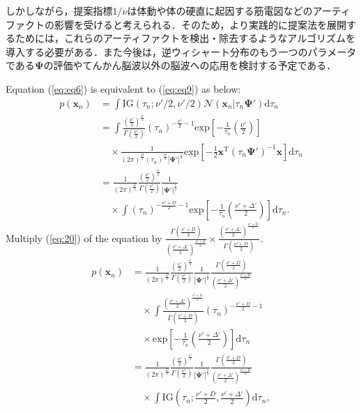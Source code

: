 \documentclass[journal]{IEEEtran}
\begin{document}
しかしながら，提案指標$1/\nu$は体動や体の硬直に起因する筋電図などのアーティファクトの影響を受けると考えられる．そのため，より実践的に提案法を展開するためには，これらのアーティファクトを検出・除去するようなアルゴリズムを導入する必要がある．また今後は，逆ウィシャート分布のもう一つのパラメータである$\mathbf{\Psi}$の評価やてんかん脳波以外の脳波への応用を検討する予定である．



Equation (\ref{eq:eq6}) is equivalent to (\ref{eq:eq9}) as below:
\begin{align}
	p(\mathbf{x}_n) &= \int \mathrm{IG}(\tau_n;\nu'/2,\nu'/2) \mathcal{N}(\mathbf{x}_n|\tau_n \mathbf{\Psi}') \mathrm{d}{\tau_n} \nonumber\\
	&= \int \frac{\left(\frac{\nu'}{2}\right)^{\frac{\nu'}{2}}}{\Gamma \left(\frac{\nu'}{2}\right)} (\tau_n)^{-\frac{\nu'}{2}-1} \mathrm{exp} \left[-\frac{1}{\tau_n} \left(\frac{\nu'}{2} \right) \right] \nonumber\\
	&\quad\times\frac{1}{(2\pi)^{\frac{D}{2}}(\tau_n)^{\frac{D}{2}}|\mathbf{\Psi'}|^{\frac{1}{2}}} \mathrm{exp} \left[-\frac{1}{2}\mathbf{x}^\mathrm{T} (\tau_n\mathbf{\Psi'})^{-1} \mathbf{x}\right] \mathrm{d}{\tau_n} \nonumber\\
	&=\frac{1}{(2\pi)^{\frac{D}{2}}}\frac{\left(\frac{\nu'}{2}\right)^{\frac{\nu'}{2}}}{\Gamma \left(\frac{\nu'}{2}\right)}\frac{1}{|\mathbf{\Psi'}|^{\frac{1}{2}}} \nonumber\\
	\label{eq:20}
	&\quad\times \int (\tau_n)^{-\frac{\nu'+D}{2}-1} \mathrm{exp} \left[-\frac{1}{\tau_n} \left(\frac{\nu' + \Delta'}{2}\right) \right] \mathrm{d}{\tau_n}.
\end{align}
Multiply (\ref{eq:20}) of the equation by $\frac{\Gamma \left(\frac{\nu'+D}{2}\right)}{\left(\frac{\nu'+\Delta'}{2}\right)^{\frac{\nu'+D}{2}}} \times \frac{\left(\frac{\nu'+\Delta'}{2}\right)^{\frac{\nu'+D}{2}}}{\Gamma \left(\frac{\nu'+D}{2}\right)}$.
\begin{align}
	p(\mathbf{x}_n) &=\frac{1}{(2\pi)^{\frac{D}{2}}}\frac{\left(\frac{\nu'}{2}\right)^{\frac{\nu'}{2}}}{\Gamma \left(\frac{\nu'}{2}\right)}\frac{1}{|\mathbf{\Psi'}|^{\frac{1}{2}}} \frac{\Gamma \left(\frac{\nu'+D}{2}\right)}{\left(\frac{\nu'+\Delta'}{2}\right)^{\frac{\nu'+D}{2}}}\nonumber\\
	&\quad\times \int \frac{\left(\frac{\nu'+\Delta'}{2}\right)^{\frac{\nu'+D}{2}}}{\Gamma \left(\frac{\nu'+D}{2}\right)} (\tau_n)^{-\frac{\nu'+D}{2}-1} \nonumber\\
	&\quad\times \mathrm{exp} \left[-\frac{1}{\tau_n} \left(\frac{\nu' + \Delta'}{2}\right) \right] \mathrm{d}{\tau_n} \nonumber\\
	&=\frac{1}{(2\pi)^{\frac{D}{2}}}\frac{\left(\frac{\nu'}{2}\right)^{\frac{\nu'}{2}}}{\Gamma \left(\frac{\nu'}{2}\right)}\frac{1}{|\mathbf{\Psi'}|^{\frac{1}{2}}} \frac{\Gamma \left(\frac{\nu'+D}{2}\right)}{\left(\frac{\nu'+\Delta'}{2}\right)^{\frac{\nu'+D}{2}}}\nonumber\\
	\label{eq:21}
	&\quad\times \int \mathrm{IG}(\tau_n;\frac{\nu'+D}{2},\frac{\nu'+\Delta'}{2}) \mathrm{d}{\tau_n},
\end{align}
\end{document}
